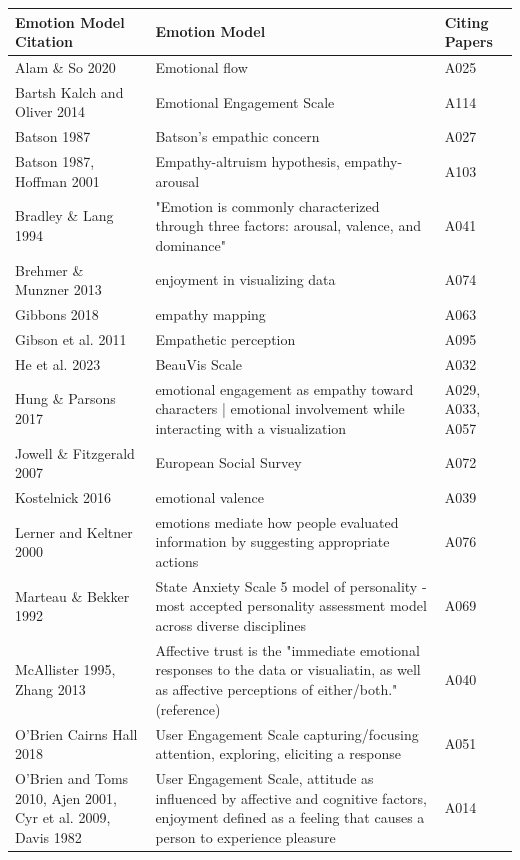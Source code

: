 \begin{table}[t]
\centering
\setlength{\tabcolsep}{6pt}
\renewcommand{\arraystretch}{1.15}
\begin{tabular*}{\textwidth}{@{\extracolsep{\fill}} p{} p{} p{} @{} }
\hline
\textbf{Emotion Model Citation} & \textbf{Emotion Model} & \textbf{Citing Papers} \\
\hline
Alam \& So 2020 & Emotional flow & A025 \\
Bartsh Kalch and Oliver 2014 & Emotional Engagement Scale & A114 \\
Batson 1987 & Batson's empathic concern & A027 \\
Batson 1987, Hoffman 2001 & Empathy-altruism hypothesis, empathy-arousal & A103 \\
Bradley \& Lang 1994 & "Emotion is commonly characterized through three factors: arousal, valence, and dominance" & A041 \\
Brehmer \& Munzner 2013 & enjoyment in visualizing data & A074 \\
Gibbons 2018 & empathy mapping & A063 \\
Gibson et al. 2011 & Empathetic perception & A095 \\
He et al. 2023 & BeauVis Scale & A032 \\
Hung \& Parsons 2017 & emotional engagement as empathy toward characters | emotional involvement while interacting with a visualization & A029, A033, A057 \\
Jowell \& Fitzgerald 2007 & European Social Survey & A072 \\
Kostelnick 2016 & emotional valence & A039 \\
Lerner and Keltner 2000 & emotions mediate how people evaluated information by suggesting appropriate actions & A076 \\
Marteau \& Bekker 1992 & State Anxiety Scale
5 model of personality - most accepted personality assessment model across diverse disciplines & A069 \\
McAllister 1995, Zhang 2013 & Affective trust is the "immediate emotional responses to the data or visualiatin, as well as affective perceptions of either/both." (reference) & A040 \\
O'Brien Cairns Hall 2018 & User Engagement Scale capturing/focusing attention, exploring, eliciting a response & A051 \\
O'Brien and Toms 2010, Ajen 2001, Cyr et al. 2009, Davis 1982 & User Engagement Scale, attitude as influenced by affective and cognitive factors, enjoyment defined as a feeling that causes a person to experience pleasure & A014 \\

\end{tabular*}
\end{table}
